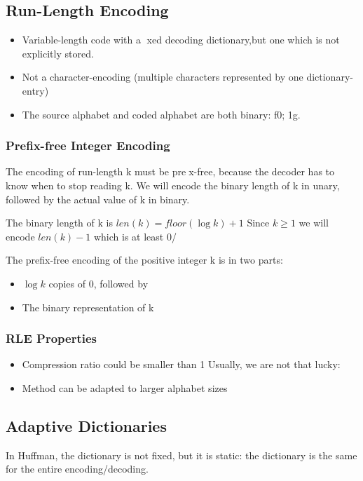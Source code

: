 \documentclass{article}
\begin{document}
\subsection*{Run-Length Encoding}
\begin{itemize}
\item Variable-length code with a xed decoding dictionary,but one which is not explicitly stored.
\item Not a character-encoding (multiple characters represented by one dictionary-entry)
\item The source alphabet and coded alphabet are both binary: f0; 1g.
\end{itemize}

\subsubsection*{Prefix-free Integer Encoding}
The encoding of run-length k must be prex-free,
because the decoder has to know when to stop reading k.
We will encode the binary length of k in unary,
followed by the actual value of k in binary.


The binary length of k  is \(len(k) = floor(\log k) + 1\) Since \(k \geq 1\) we will encode \(len(k) - 1\) which is at least 0/

The prefix-free encoding of the positive integer k is in two parts:
\begin{itemize}
\item \(\log k\) copies of 0, followed by
\item  The binary representation of k
\end{itemize}

\subsubsection*{RLE Properties}
\begin{itemize}
\item Compression ratio could be smaller than 1%
Usually, we are not that lucky:
\item Method can be adapted to larger alphabet sizes
\end{itemize}

\subsection*{Adaptive Dictionaries}
In Huffman, the dictionary is not fixed, but it is static: the dictionary is the same for the entire encoding/decoding.
\end{document}

